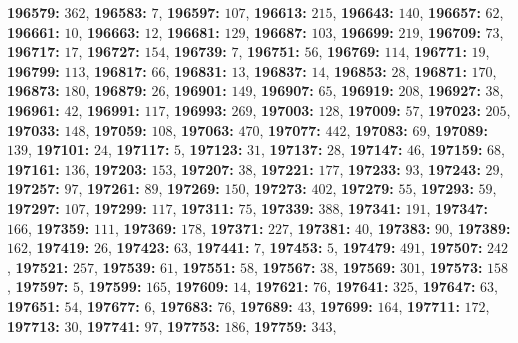 \textsf{\bfseries 196579:} $362$, \textsf{\bfseries 196583:} $7$, \textsf{\bfseries 196597:} $107$, \textsf{\bfseries 196613:} $215$, \textsf{\bfseries 196643:} $140$, \textsf{\bfseries 196657:} $62$, \textsf{\bfseries 196661:} $10$, \textsf{\bfseries 196663:} $12$, \textsf{\bfseries 196681:} $129$, \textsf{\bfseries 196687:} $103$, \textsf{\bfseries 196699:} $219$, \textsf{\bfseries 196709:} $73$, \textsf{\bfseries 196717:} $17$, \textsf{\bfseries 196727:} $154$, \textsf{\bfseries 196739:} $7$, \textsf{\bfseries 196751:} $56$, \textsf{\bfseries 196769:} $114$, \textsf{\bfseries 196771:} $19$, \textsf{\bfseries 196799:} $113$, \textsf{\bfseries 196817:} $66$, \textsf{\bfseries 196831:} $13$, \textsf{\bfseries 196837:} $14$, \textsf{\bfseries 196853:} $28$, \textsf{\bfseries 196871:} $170$, \textsf{\bfseries 196873:} $180$, \textsf{\bfseries 196879:} $26$, \textsf{\bfseries 196901:} $149$, \textsf{\bfseries 196907:} $65$, \textsf{\bfseries 196919:} $208$, \textsf{\bfseries 196927:} $38$, \textsf{\bfseries 196961:} $42$, \textsf{\bfseries 196991:} $117$, \textsf{\bfseries 196993:} $269$, \textsf{\bfseries 197003:} $128$, \textsf{\bfseries 197009:} $57$, \textsf{\bfseries 197023:} $205$, \textsf{\bfseries 197033:} $148$, \textsf{\bfseries 197059:} $108$, \textsf{\bfseries 197063:} $470$, \textsf{\bfseries 197077:} $442$, \textsf{\bfseries 197083:} $69$, \textsf{\bfseries 197089:} $139$, \textsf{\bfseries 197101:} $24$, \textsf{\bfseries 197117:} $5$, \textsf{\bfseries 197123:} $31$, \textsf{\bfseries 197137:} $28$, \textsf{\bfseries 197147:} $46$, \textsf{\bfseries 197159:} $68$, \textsf{\bfseries 197161:} $136$, \textsf{\bfseries 197203:} $153$, \textsf{\bfseries 197207:} $38$, \textsf{\bfseries 197221:} $177$, \textsf{\bfseries 197233:} $93$, \textsf{\bfseries 197243:} $29$, \textsf{\bfseries 197257:} $97$, \textsf{\bfseries 197261:} $89$, \textsf{\bfseries 197269:} $150$, \textsf{\bfseries 197273:} $402$, \textsf{\bfseries 197279:} $55$, \textsf{\bfseries 197293:} $59$, \textsf{\bfseries 197297:} $107$, \textsf{\bfseries 197299:} $117$, \textsf{\bfseries 197311:} $75$, \textsf{\bfseries 197339:} $388$, \textsf{\bfseries 197341:} $191$, \textsf{\bfseries 197347:} $166$, \textsf{\bfseries 197359:} $111$, \textsf{\bfseries 197369:} $178$, \textsf{\bfseries 197371:} $227$, \textsf{\bfseries 197381:} $40$, \textsf{\bfseries 197383:} $90$, \textsf{\bfseries 197389:} $162$, \textsf{\bfseries 197419:} $26$, \textsf{\bfseries 197423:} $63$, \textsf{\bfseries 197441:} $7$, \textsf{\bfseries 197453:} $5$, \textsf{\bfseries 197479:} $491$, \textsf{\bfseries 197507:} $242$, \textsf{\bfseries 197521:} $257$, \textsf{\bfseries 197539:} $61$, \textsf{\bfseries 197551:} $58$, \textsf{\bfseries 197567:} $38$, \textsf{\bfseries 197569:} $301$, \textsf{\bfseries 197573:} $158$, \textsf{\bfseries 197597:} $5$, \textsf{\bfseries 197599:} $165$, \textsf{\bfseries 197609:} $14$, \textsf{\bfseries 197621:} $76$, \textsf{\bfseries 197641:} $325$, \textsf{\bfseries 197647:} $63$, \textsf{\bfseries 197651:} $54$, \textsf{\bfseries 197677:} $6$, \textsf{\bfseries 197683:} $76$, \textsf{\bfseries 197689:} $43$, \textsf{\bfseries 197699:} $164$, \textsf{\bfseries 197711:} $172$, \textsf{\bfseries 197713:} $30$, \textsf{\bfseries 197741:} $97$, \textsf{\bfseries 197753:} $186$, \textsf{\bfseries 197759:} $343$, 
